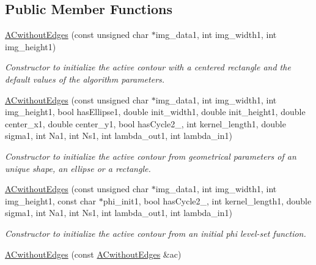 \subsection*{Public Member Functions}
\begin{DoxyCompactItemize}
\item 
\hypertarget{classofeli_1_1_a_cwithout_edges_a50545482590fb3d7ea40df3382452dfb}{\hyperlink{classofeli_1_1_a_cwithout_edges_a50545482590fb3d7ea40df3382452dfb}{A\-Cwithout\-Edges} (const unsigned char $\ast$img\-\_\-data1, int img\-\_\-width1, int img\-\_\-height1)}\label{classofeli_1_1_a_cwithout_edges_a50545482590fb3d7ea40df3382452dfb}

\begin{DoxyCompactList}\small\item\em Constructor to initialize the active contour with a centered rectangle and the default values of the algorithm parameters. \end{DoxyCompactList}\item 
\hyperlink{classofeli_1_1_a_cwithout_edges_ad3be07385b0a0d693036ddee99bdaf2b}{A\-Cwithout\-Edges} (const unsigned char $\ast$img\-\_\-data1, int img\-\_\-width1, int img\-\_\-height1, bool has\-Ellipse1, double init\-\_\-width1, double init\-\_\-height1, double center\-\_\-x1, double center\-\_\-y1, bool has\-Cycle2\-\_, int kernel\-\_\-length1, double sigma1, int Na1, int Ns1, int lambda\-\_\-out1, int lambda\-\_\-in1)
\begin{DoxyCompactList}\small\item\em Constructor to initialize the active contour from geometrical parameters of an unique shape, an ellipse or a rectangle. \end{DoxyCompactList}\item 
\hyperlink{classofeli_1_1_a_cwithout_edges_a3aafada5bffe3d4251ff22cd22ebb401}{A\-Cwithout\-Edges} (const unsigned char $\ast$img\-\_\-data1, int img\-\_\-width1, int img\-\_\-height1, const char $\ast$phi\-\_\-init1, bool has\-Cycle2\-\_, int kernel\-\_\-length1, double sigma1, int Na1, int Ns1, int lambda\-\_\-out1, int lambda\-\_\-in1)
\begin{DoxyCompactList}\small\item\em Constructor to initialize the active contour from an initial phi level-\/set function. \end{DoxyCompactList}\item 
\hypertarget{classofeli_1_1_a_cwithout_edges_ad5d3e6800f33e0fdd396adcd031ca401}{\hyperlink{classofeli_1_1_a_cwithout_edges_ad5d3e6800f33e0fdd396adcd031ca401}{A\-Cwithout\-Edges} (const \hyperlink{classofeli_1_1_a_cwithout_edges}{A\-Cwithout\-Edges} \&ac)}\label{classofeli_1_1_a_cwithout_edges_ad5d3e6800f33e0fdd396adcd031ca401}


\end{DoxyCompactItemize}
